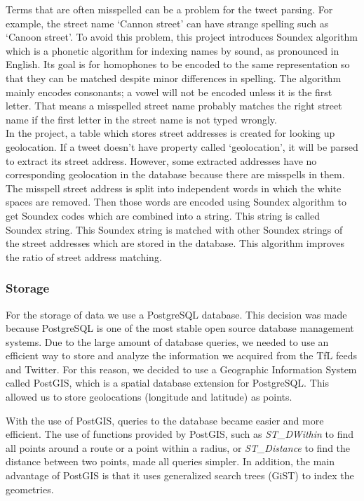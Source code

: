 Terms that are often misspelled can be a problem for the tweet parsing. For example, the street name `Cannon street' can have strange spelling such as `Canoon street'. To avoid this problem, this project introduces Soundex algorithm which is a phonetic algorithm for indexing names by sound, as pronounced in English. Its goal is for homophones to be encoded to the same representation so that they can be matched despite minor differences in spelling. The algorithm mainly encodes consonants; a vowel will not be encoded unless it is the first letter. That means a misspelled street name probably matches the right street name if the first letter in the street name is not typed wrongly.\\
In the project, a table which stores street addresses is created for looking up geolocation. If a tweet doesn't have property called `geolocation', it will be parsed to extract its street address. However, some extracted addresses have no corresponding geolocation in the database because there are misspells in them. The misspell street address is split into independent words in which the white spaces are removed. Then those words are encoded using Soundex algorithm to get Soundex codes which are combined into a string. This string is called Soundex string. This Soundex string is matched with other Soundex strings of the street addresses which are stored in the database. This algorithm improves the ratio of street address matching.


\subsubsection{Storage}
For the storage of data we use a PostgreSQL database. This decision was made because PostgreSQL is one of the most stable open source database management systems. Due to the large amount of database queries, we needed to use an efficient way to store and analyze the information we acquired from the TfL feeds and Twitter. For this reason, we decided to use a Geographic Information System called PostGIS, which is a spatial database extension for PostgreSQL. This allowed us to store geolocations (longitude and latitude) as points.

With the use of PostGIS, queries to the database became easier and more efficient. The use of functions provided by PostGIS, such as \emph{ST\_DWithin} to find all points around a route or a point within a radius, or \emph{ST\_Distance} to find the distance between two points, made all queries simpler. In addition, the main advantage of PostGIS is that it uses generalized search trees (GiST) to index the geometries. 

